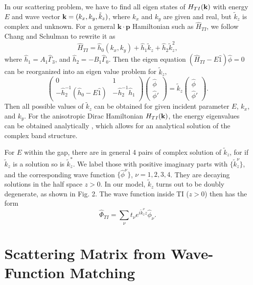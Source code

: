 In our scattering problem, we have to find all eigen states of $H_{TI}(\mathbf{k})$ with energy $E$ and 
wave vector $\mathbf{k}=(k_x,k_y,\tilde{k}_z)$, where $k_x$ and $k_y$ are given and real, but $\tilde{k}_z$ is 
complex and unknown. For a general $\mathbf{k\cdot p}$ Hamiltonian such as $\hat{H}_{TI}$, 
we follow Chang and Schulman \cite{chang82} to rewrite it as
\[
\hat{H}_{TI}=\hat{h}_0(k_x,k_y)+\hat{h}_1 \tilde{k}_z+\hat{h}_2\tilde{k}^2_z,
\]
where $\hat{h}_1=A_1\hat{\Gamma}_3$, and $\hat{h}_2=-B_1\hat{\Gamma}_0$. 
Then the eigen equation $(\hat{H}_{TI}-E\hat{1})\hat{\phi}=0$ can be reorganized into an 
eigen value problem for $\tilde{k}_z$,
\[
\left(
\begin{array}{ll}
  0 & 1   \\
  -\hat{h}_2^{-1}(\hat{h}_0-E\hat{1}) & -\hat{h}_2^{-1}\hat{h}_1
  \end{array}
\right)
\left(
\begin{array}{l}
  \hat{\phi}   \\
  \hat{\phi}'  
\end{array}
\right)
=\tilde{k}_z \left(
\begin{array}{l}
  \hat{\phi}   \\
  \hat{\phi}'    
\end{array}
\right).
\]
Then all possible values of $\tilde{k}_z$ can be obtained for given incident parameter $E$, $k_x$, and $k_y$. 
For the anisotropic Dirac Hamiltonian $H_{TI}(\mathbf{k})$, the energy eigenvalues can be obtained 
analytically \cite{qi_field}, which allows for an analytical solution of the complex band structure.

For $E$ within the gap, there are in general 4 pairs of complex solution of $\tilde{k}_z$, for if $\tilde{k}_z$ is a solution so is $\tilde{k}^*_z$. 
We label those with positive imaginary parts with $\{\tilde{k}^\nu_z\}$, and the corresponding wave function $\{\hat{\phi}^\nu \}$, $\nu=1,2,3,4$. They are decaying solutions in the half space $z>0$. In our model, $\tilde{k}_z$ turns out to be doubly degenerate, as shown in Fig. 2. The wave function inside TI ($z>0$) then has the form
\[
\hat{\Phi}_{TI}=\sum_{\nu} t_\nu e^{i\tilde{k}^\nu_z z} \hat{\phi}_\nu.
\]

\section{Scattering Matrix from Wave-Function Matching} 

